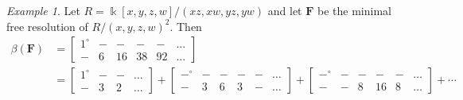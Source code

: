 \documentclass[12pt]{amsart}
\theoremstyle{definition}
\theoremstyle{remark}
\newtheorem{example}[lemma]{Example}
\newcommand{\kk}{\Bbbk}
\newcommand{\FF}{\mathbf{F}}
\newcommand{\zp}{\circ}
\begin{document}

\begin{example}
Let $R=\kk[x,y,z,w]/(xz,xw,yz,yw)$ and let $\FF$ be the minimal free resolution of $R/(x,y,z,w)^2$.  Then
\begin{align*}
\beta(\FF)&=\begin{bmatrix}1^\zp&-&-&-&-&\dots \\ -&6&16&38&92&\dots \end{bmatrix}\\
&=\begin{bmatrix}1^\zp&-&-&\dots \\ -&3&2&\dots \end{bmatrix}
+
\begin{bmatrix}-^\zp&-&-&-&-&\dots \\ -&3&6&3&-&\dots \end{bmatrix}
+
\begin{bmatrix}-^\zp&-&-&-&-&\dots \\ -&-&8&16&8&\dots \end{bmatrix}
+
\cdots
\end{align*}
\end{example}
\end{document}
